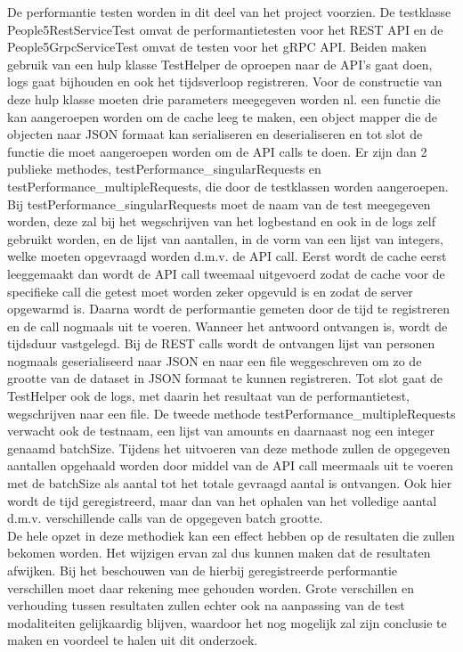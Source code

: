 De performantie testen worden in dit deel van het project voorzien. De testklasse People5RestServiceTest omvat de performantietesten voor het REST API
en de People5GrpcServiceTest omvat de testen voor het gRPC API. Beiden maken gebruik van een hulp klasse TestHelper de oproepen naar de API's gaat doen,
logs gaat bijhouden en ook het tijdsverloop registreren. Voor de constructie van deze hulp klasse moeten drie parameters meegegeven worden nl. een functie
die kan aangeroepen worden om de cache leeg te maken, een object mapper die de objecten naar JSON formaat kan serialiseren en deserialiseren en tot slot de
functie die moet aangeroepen worden om de API calls te doen. Er zijn dan 2 publieke methodes, testPerformance\_singularRequests en testPerformance\_multipleRequests,
die door de testklassen worden aangeroepen. Bij testPerformance\_singularRequests moet de naam van de test meegegeven worden, deze zal bij het wegschrijven
van het logbestand en ook in de logs zelf gebruikt worden, en de lijst van aantallen, in de vorm van een lijst van integers, welke moeten opgevraagd worden
d.m.v. de API call. Eerst wordt de cache eerst leeggemaakt dan wordt de API call tweemaal uitgevoerd zodat de cache voor de specifieke call die getest moet worden
zeker opgevuld is en zodat de server opgewarmd is. Daarna wordt de performantie gemeten door de tijd te registreren en de call nogmaals uit te voeren.
Wanneer het antwoord ontvangen is, wordt de tijdsduur vastgelegd. Bij de REST calls wordt de ontvangen lijst van personen nogmaals geserialiseerd naar JSON
en naar een file weggeschreven om zo de grootte van de dataset in JSON formaat te kunnen registreren.
Tot slot gaat de TestHelper ook de logs, met daarin het resultaat van de performantietest, wegschrijven naar een file.
De tweede methode testPerformance\_multipleRequests verwacht ook de testnaam, een lijst van amounts en daarnaast nog een integer genaamd batchSize.
Tijdens het uitvoeren van deze methode zullen de opgegeven aantallen opgehaald worden door middel van de API call meermaals uit te voeren met de batchSize als aantal
tot het totale gevraagd aantal is ontvangen. Ook hier wordt de tijd geregistreerd, maar dan van het ophalen van het volledige aantal d.m.v.
verschillende calls van de opgegeven batch grootte.\\

De hele opzet in deze methodiek kan een effect hebben op de resultaten die zullen bekomen worden. Het wijzigen ervan zal dus kunnen maken dat de resultaten afwijken.
Bij het beschouwen van de hierbij geregistreerde performantie verschillen moet daar rekening mee gehouden worden. Grote verschillen en verhouding tussen resultaten zullen echter
ook na aanpassing van de test modaliteiten gelijkaardig blijven, waardoor het nog mogelijk zal zijn conclusie te maken en voordeel te halen uit dit onderzoek.\\

